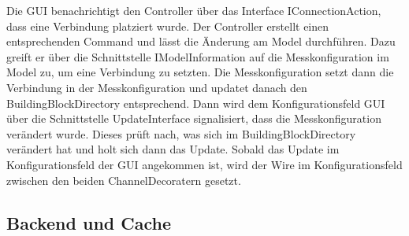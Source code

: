 \documentclass[parskip=full]{scrartcl}
\begin{document}
Die GUI benachrichtigt den Controller über das Interface IConnectionAction, dass eine Verbindung platziert wurde. Der Controller erstellt einen entsprechenden Command und lässt die Änderung am Model durchführen. Dazu greift er über die Schnittstelle IModelInformation auf die Messkonfiguration im Model zu, um eine Verbindung zu setzten. Die Messkonfiguration setzt dann die Verbindung in der Messkonfiguration und updatet danach den BuildingBlockDirectory entsprechend. Dann wird dem Konfigurationsfeld GUI über die Schnittstelle UpdateInterface signalisiert, dass die Messkonfiguration verändert wurde. Dieses prüft nach, was sich im BuildingBlockDirectory verändert hat und holt sich dann das Update. Sobald das Update im Konfigurationsfeld der GUI angekommen ist, wird der Wire im Konfigurationsfeld zwischen den beiden ChannelDecoratern gesetzt.

\subsection{Backend und Cache}
\end{document}
